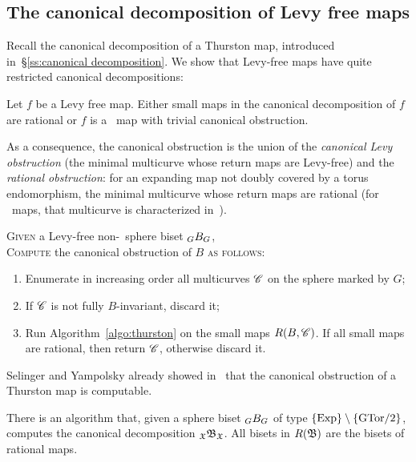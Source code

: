 \documentclass{amsart}
\begin{document}
\subsection{The canonical decomposition of Levy free maps}
Recall the canonical decomposition of a Thurston map, introduced
in~\S\ref{ss:canonical decomposition}. We show that Levy-free maps
have quite restricted canonical decompositions:

\begin{lem}
  Let $f$ be a Levy free map. Either small maps in the canonical
  decomposition of $f$ are rational or $f$ is a \Tor\ map with trivial
  canonical obstruction.
\end{lem}
As a consequence, the canonical obstruction is the union of the
\emph{canonical Levy obstruction} (the minimal multicurve whose return maps
are Levy-free) and the \emph{rational obstruction}: for an expanding map
not doubly covered by a torus endomorphism, the minimal multicurve whose
return maps are rational (for \Tor\ maps, that multicurve is characterized
in~\cite{selinger:canonical}).

\begin{algo}\label{algo:canonical}
  \textsc{Given} a Levy-free non-\Tor\ sphere biset $\subscript GB_G$,\\
  \textsc{Compute} the canonical obstruction of $B$ \textsc{ as follows:}\\
  \begin{enumerate}
  \item Enumerate in increasing order all multicurves ${\mathscr C}$ on the
    sphere marked by $G$;
  \item If ${\mathscr C}$ is not fully $B$-invariant, discard it;
  \item Run Algorithm~\ref{algo:thurston} on the small maps
    $R(B,{\mathscr C})$. If all small maps are rational, then return ${\mathscr C}$,
    otherwise discard it.
  \end{enumerate}
\end{algo}
\noindent Selinger and Yampolsky already showed
in~\cite{selinger-yampolsky:geometrization} that the canonical
obstruction of a Thurston map is computable.
\begin{cor}\label{cor:CanDecExp}
  There is an algorithm that, given a sphere biset $\subscript GB_G$ of type
  $\{\operatorname{Exp}\}\setminus\{\operatorname{GTor/2}\}$, computes the canonical decomposition
  $\subscript \gf\gfB_\gf$. All bisets in $R({\mathfrak B})$ are the
  bisets of rational maps.
\end{cor}
\end{document}

